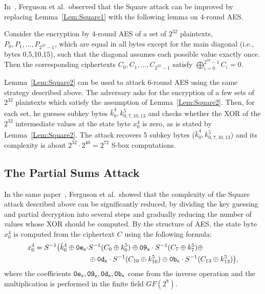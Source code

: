 In~\cite{FSE:FKLSSWW00}, Ferguson et al.~observed that the Square attack can be improved by replacing Lemma~\ref{Lem:Square1} with the following lemma on 4-round AES.
\begin{lemma}\label{Lem:Square2}
Consider the encryption by 4-round AES of a set of $2^{32}$ plaintexts, $P_0,P_1,\ldots,P_{2^{32}-1}$, which are equal in all bytes except for the main diagonal (i.e., bytes 0,5,10,15), such that the diagonal assumes each possible value exactly once. Then the corresponding ciphertexts $C_0,C_1,\ldots,C_{2^{32}-1}$ satisfy $\bigoplus_{i=0}^{2^{32}-1} C_i=0$.  
\end{lemma}
Lemma~\ref{Lem:Square2} can be used to attack 6-round AES using the same strategy described above. The adversary asks for the encryption of a few sets of $2^{32}$ plaintexts which satisfy the assumption of Lemma~\ref{Lem:Square2}. Then, for each set, he guesses subkey bytes $\bar{k}^4_0,k^5_{0,7,10,13}$ and checks whether the XOR of the $2^{32}$ intermediate values at the state byte $x^4_0$ is zero, as is stated by Lemma~\ref{Lem:Square2}. The attack recovers 5 subkey bytes ($\bar{k}^4_0,k^5_{0,7,10,13}$) and its complexity is about $2^{32} \cdot 2^{40}=2^{72}$ S-box computations.

\subsection{The Partial Sums Attack}
\label{sec:sub:partial-sums}

In the same paper~\cite{FSE:FKLSSWW00}, Ferguson et al.~showed that the complexity of the Square attack described above can be significantly reduced, by dividing the key guessing and partial decryption into several steps and gradually reducing the number of values whose XOR should be computed. By the structure of AES, the state byte $x^4_0$ is computed from the ciphertext $C$ using the following formula:
\begin{align}\label{Eq:Square1}
  \begin{split}
x^4_0=S^{-1}\big(\bar{k}^4_0 \oplus \mathtt{0e}_{\mathsf{x}} \cdot &S^{-1}(C_0 \oplus k^5_0) \oplus \mathtt{09}_{\mathsf{x}} \cdot S^{-1}(C_7 \oplus k^5_7) \oplus \\
&\oplus \mathtt{0d}_{\mathsf{x}} \cdot S^{-1}(C_{10} \oplus k^5_{10}) \oplus \mathtt{0b}_{\mathsf{x}} \cdot S^{-1}(C_{13} \oplus k^5_{13})\big),
  \end{split}  
\end{align}
where the coefficients $\mathtt{0e}_{\mathsf{x}},\mathtt{09}_{\mathsf{x}},\mathtt{0d}_{\mathsf{x}},\mathtt{0b}_{\mathsf{x}}$ come from the inverse \mc operation and the multiplication is performed in the finite field $GF(2^8)$. 

